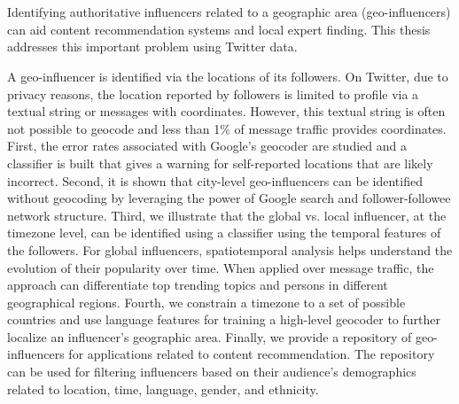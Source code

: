 \section*{}
\thispagestyle{empty}
Identifying authoritative influencers related to a geographic area (geo-influencers) can aid content recommendation systems and local expert finding. This thesis addresses this important problem using Twitter data.

A geo-influencer is identified via the locations of its followers. On Twitter, due to privacy reasons, the location reported by followers is limited to profile via a textual string or messages with coordinates. However, this textual string is often not possible to geocode and less than 1\% of message traffic provides coordinates. First, the error rates associated with Google's geocoder are studied and a classifier is built that gives a warning for self-reported locations that are likely incorrect. Second, it is shown that city-level geo-influencers can be identified without geocoding by leveraging the power of Google search and follower-followee network structure. Third, we illustrate that the global vs. local influencer, at the timezone level, can be identified using a classifier using the temporal features of the followers. For global influencers, spatiotemporal analysis helps understand the evolution of their popularity over time. When applied over message traffic, the approach can differentiate top trending topics and persons in different geographical regions. Fourth, we constrain a timezone to a set of possible countries and use language features for training a high-level geocoder to further localize an influencer's geographic area. Finally, we provide a repository of geo-influencers for applications related to content recommendation. The repository can be used for filtering influencers based on their audience's demographics related to location, time, language, gender, and ethnicity.
